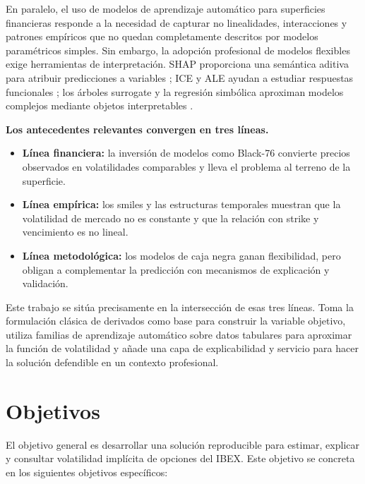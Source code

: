 En paralelo, el uso de modelos de aprendizaje automático para superficies financieras responde a la necesidad de capturar no linealidades, interacciones y patrones empíricos que no quedan completamente descritos por modelos paramétricos simples. Sin embargo, la adopción profesional de modelos flexibles exige herramientas de interpretación. SHAP proporciona una semántica aditiva para atribuir predicciones a variables \citep{lundberg2017unified}; ICE y ALE ayudan a estudiar respuestas funcionales \citep{goldstein2015peeking,apley2020visualizing}; los árboles surrogate y la regresión simbólica aproximan modelos complejos mediante objetos interpretables \citep{cranmer2023interpretable}.

\textbf{Los antecedentes relevantes convergen en tres líneas.}

\begin{itemize}
  \item \textbf{Línea financiera:} la inversión de modelos como Black-76 convierte precios observados en volatilidades comparables y lleva el problema al terreno de la superficie.
  \item \textbf{Línea empírica:} los smiles y las estructuras temporales muestran que la volatilidad de mercado no es constante y que la relación con strike y vencimiento es no lineal.
  \item \textbf{Línea metodológica:} los modelos de caja negra ganan flexibilidad, pero obligan a complementar la predicción con mecanismos de explicación y validación.
\end{itemize}

Este trabajo se sitúa precisamente en la intersección de esas tres líneas. Toma la formulación clásica de derivados como base para construir la variable objetivo, utiliza familias de aprendizaje automático sobre datos tabulares para aproximar la función de volatilidad y añade una capa de explicabilidad y servicio para hacer la solución defendible en un contexto profesional.

\section{Objetivos}
\label{sec:objetivos}

El objetivo general es desarrollar una solución reproducible para estimar, explicar y consultar volatilidad implícita de opciones del IBEX. Este objetivo se concreta en los siguientes objetivos específicos:

